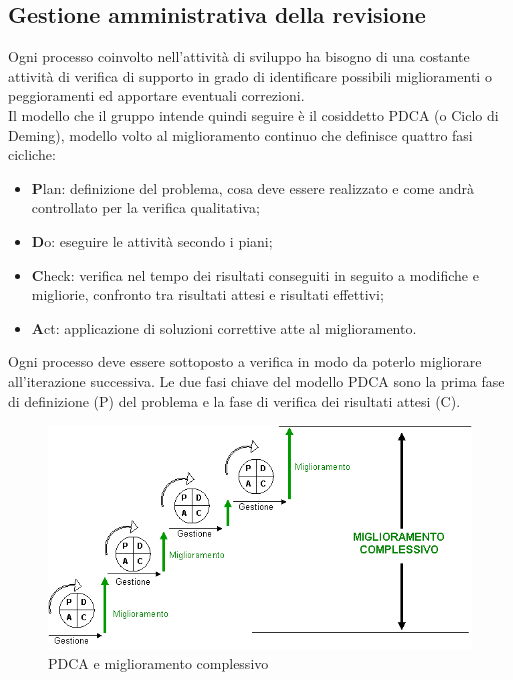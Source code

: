 \documentclass[a4paper,11pt]{article}
\begin{document}
\subsection{Gestione amministrativa della revisione}
Ogni processo coinvolto nell'attività di sviluppo ha bisogno di una costante attività di verifica di supporto in grado di identificare possibili miglioramenti o peggioramenti ed apportare eventuali correzioni. \\
Il modello che il gruppo intende quindi seguire è il cosiddetto PDCA (o Ciclo di Deming), modello volto al miglioramento continuo che definisce quattro fasi cicliche:
\begin{itemize}
\item \textbf{P}lan: definizione del problema, cosa deve essere realizzato e come andrà controllato per la verifica qualitativa;
\item \textbf{D}o: eseguire le attività secondo i piani;
\item \textbf{C}heck: verifica nel tempo dei risultati conseguiti in seguito a modifiche e migliorie, confronto tra risultati attesi e risultati effettivi; %
\item \textbf{A}ct: applicazione di soluzioni correttive atte al miglioramento.
\end{itemize}
Ogni processo deve essere sottoposto a verifica in modo da poterlo migliorare all'iterazione successiva. 
Le due fasi chiave del modello PDCA sono la prima fase di definizione (P) del problema e la fase di verifica dei risultati attesi (C). 
\begin{figure}[h!]
\centering
\includegraphics[scale=0.6]{../images/PDCA}
\caption{PDCA e miglioramento complessivo}
\end{figure}
\end{document}
